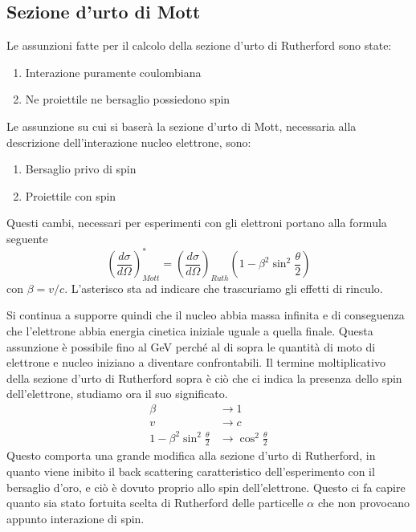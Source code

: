 \subsection{Sezione d'urto di Mott}
Le assunzioni fatte per il calcolo della sezione d'urto di Rutherford sono state:
\begin{enumerate}
\item Interazione puramente coulombiana
\item Ne proiettile ne bersaglio possiedono spin
\end{enumerate}
Le assunzione su cui si baserà la sezione d'urto di Mott, necessaria alla descrizione dell'interazione nucleo elettrone, sono:
\begin{enumerate}
\item Bersaglio privo di spin
\item Proiettile con spin
\end{enumerate}
Questi cambi, necessari per esperimenti con gli elettroni portano alla formula seguente
\begin{equation}
\left(\frac{d\sigma}{d\Omega}\right)^*_{Mott} =\left(\frac{d\sigma}{d\Omega}\right)_{Ruth}\left(1-\beta^2\sin^2\frac{\theta}{2}\right)
\end{equation}
con $\beta=v/c$.
L'asterisco sta ad indicare che trascuriamo gli effetti di rinculo.

Si continua a supporre quindi che il nucleo abbia massa infinita e di conseguenza che l'elettrone abbia energia cinetica iniziale uguale a quella finale.
Questa assunzione è possibile fino al GeV perché al di sopra le quantità di moto di elettrone e nucleo iniziano a diventare confrontabili.
Il termine moltiplicativo della sezione d'urto di Rutherford sopra è ciò che ci indica la presenza dello spin dell'elettrone, studiamo ora il suo significato.
\begin{equation}
\begin{split}
\beta&\to1\\
v&\to c\\
1-\beta^2\sin^2\frac{\theta}{2}&\to \cos^2\frac{\theta}{2}
\end{split}
\end{equation}
Questo comporta una grande modifica alla sezione d'urto di Rutherford, in quanto viene inibito il back scattering caratteristico dell'esperimento con il bersaglio d'oro, e ciò è dovuto proprio allo spin dell'elettrone.
Questo ci fa capire quanto sia stato fortuita scelta di Rutherford delle particelle $\alpha$ che non provocano appunto interazione di spin.

